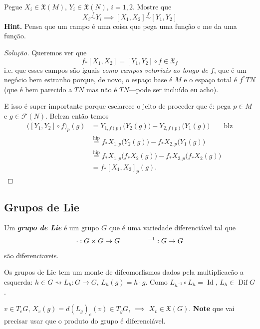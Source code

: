 \begin{exercise}\leavevmode
	Pegue \(X_i \in \mathfrak{X}(M)\), \(Y_i\in \mathfrak{X}(N)\), \(i=1,2\). Mostre que  \[X_i \overset{f}{\sim}Y_i\implies [X_1,X_2] \overset{f}{\sim}[Y_1,Y_2]\]
\textbf{Hint.} Pensa que um campo é uma coisa que pega uma função e me da uma função.
\end{exercise}

\begin{proof}[Solução]\leavevmode
	Queremos ver que
	\[f_*[X_1,X_2]=[Y_1,Y_2]\circ f \in \mathfrak{X}_f\]
i.e. que esses campos são iguais \textit{como campos vetoriais ao longo de \(f\)}, que é um negócio bem estranho porque, de novo, o espaço base é \(M\) e o espaço total é \(f^* TN\) (que é bem parecido a \(TN\) mas  não é \(TN\)---pode ser incluído eu acho).

E isso é super importante porque esclarece o jeito de proceder que é: pega \(p \in M\) e \(g \in \mathcal{F}(N)\). Beleza então temos
	\begin{align*}
	\Big([Y_1,Y_2]\circ f\Big)_p(g)&=Y_{1,f(p)}\Big(Y_2(g)\Big)-Y_{2,f(p)}\Big(Y_1(g)\Big)\qquad \text{blz} \\
				       &\overset{\operatorname{hip}}{=}f_*X_{1,p}\Big(Y_2(g)\Big)-f_*X_{2,p}\Big(Y_1(g)\Big)\\
&\overset{\operatorname{hip}}{=}f_*X_{1,p}\Big(f_*X_2(g)\Big)-f_*X_{2,p}\Big(f_*X_2(g)\Big)\\
&=f_*[X_1,X_2]_p(g).
	\end{align*}
\end{proof}

\subsection{Grupos de Lie}

\begin{defn}\leavevmode
Um \textit{\textbf{grupo de Lie}} é um grupo \(G\) que é uma variedade diferenciável tal que
\[\cdot :G \times G \to G \qquad \qquad \leavevmode^{-1}:G \to G\]
são diferenciaveis.
\end{defn}

Os grupos de Lie tem um monte de difeomorfismos dados pela multiplicacão a esquerda: \(h \in G \rightsquigarrow L_h:G \to G\), \(L_h(g)=h\cdot g\). Como \(L_{h^{-1}}\circ L_h=\operatorname{Id}\), \(L_h \in \operatorname{Dif}G\).

\begin{exercise}\leavevmode
\(v \in T_eG\), \(X_v(g)=d(L_g)_e(v) \in T_gG\), \(\implies\) \(X_v \in \mathfrak{X}(G)\). \textbf{Note} que vai precisar usar que o produto do grupo é diferenciável.
\end{exercise}

